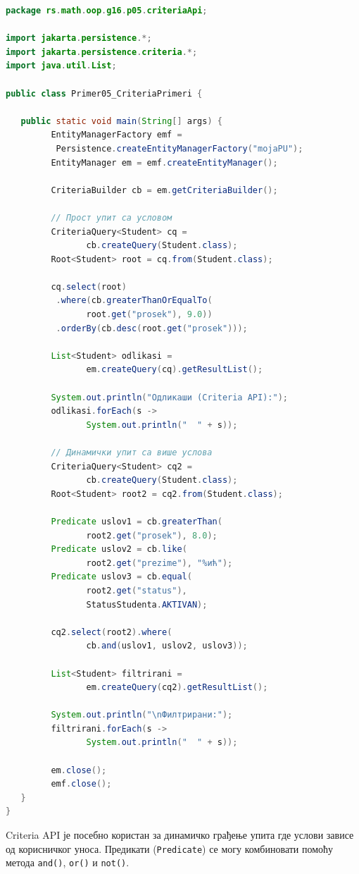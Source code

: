 \begin{lstlisting}[language=Java]
package rs.math.oop.g16.p05.criteriaApi;
 
import jakarta.persistence.*;
import jakarta.persistence.criteria.*;
import java.util.List;
 
public class Primer05_CriteriaPrimeri {
 
   public static void main(String[] args) {
         EntityManagerFactory emf =
          Persistence.createEntityManagerFactory("mojaPU");
         EntityManager em = emf.createEntityManager();
 
         CriteriaBuilder cb = em.getCriteriaBuilder();
 
         // Прост упит са условом
         CriteriaQuery<Student> cq =
                cb.createQuery(Student.class);
         Root<Student> root = cq.from(Student.class);
 
         cq.select(root)
          .where(cb.greaterThanOrEqualTo(
                root.get("prosek"), 9.0))
          .orderBy(cb.desc(root.get("prosek")));
 
         List<Student> odlikasi =
                em.createQuery(cq).getResultList();
 
         System.out.println("Одликаши (Criteria API):");
         odlikasi.forEach(s ->
                System.out.println("  " + s));
 
         // Динамички упит са више услова
         CriteriaQuery<Student> cq2 =
                cb.createQuery(Student.class);
         Root<Student> root2 = cq2.from(Student.class);
 
         Predicate uslov1 = cb.greaterThan(
                root2.get("prosek"), 8.0);
         Predicate uslov2 = cb.like(
                root2.get("prezime"), "%ић");
         Predicate uslov3 = cb.equal(
                root2.get("status"),
                StatusStudenta.AKTIVAN);
 
         cq2.select(root2).where(
                cb.and(uslov1, uslov2, uslov3));
 
         List<Student> filtrirani =
                em.createQuery(cq2).getResultList();
 
         System.out.println("\nФилтрирани:");
         filtrirani.forEach(s ->
                System.out.println("  " + s));
 
         em.close();
         emf.close();
   }
}
\end{lstlisting}


Criteria API је посебно користан за динамичко грађење упита где услови зависе од корисничког уноса. Предикати (\texttt{Predicate}) се могу комбиновати помоћу метода \texttt{and()}, \texttt{or()} и \texttt{not()}.


